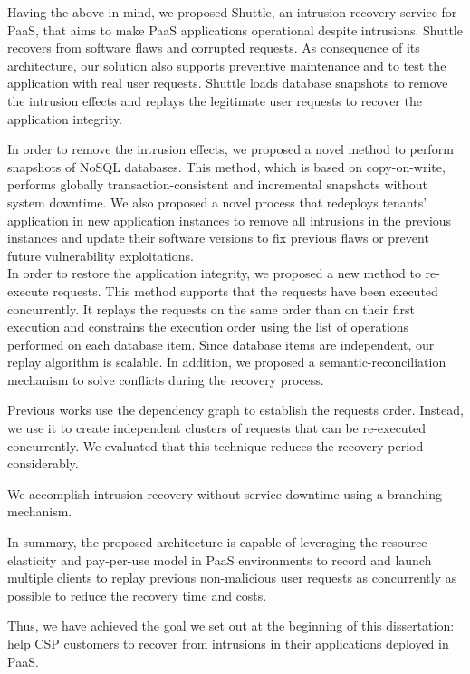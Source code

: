 Having the above in mind, we proposed Shuttle, an intrusion recovery service for \ac{PaaS}, that aims to make \ac{PaaS} applications operational despite intrusions. Shuttle recovers from software flaws and corrupted requests. As consequence of its architecture, our solution also supports preventive maintenance and to test the application with real user requests. Shuttle loads database snapshots to remove the intrusion effects and replays the legitimate user requests to recover the application integrity.

In order to remove the intrusion effects, we proposed a novel method to perform snapshots of \acs{NoSQL} databases. This method, which is based on copy-on-write, performs globally transaction-consistent and incremental snapshots without system downtime. We also proposed a novel process that redeploys tenants' application in new application instances to remove all intrusions in the previous instances and update their software versions to fix previous flaws or prevent future vulnerability exploitations.\\

In order to restore the application integrity, we proposed a new method to re-execute requests. This method supports that the requests have been executed concurrently. It replays the requests on the same order than on their first execution and constrains the execution order using the list of operations performed on each database item. Since database items are independent, our replay algorithm is scalable. In addition, we proposed a semantic-reconciliation mechanism to solve conflicts during the recovery process.

Previous works use the dependency graph to establish the requests order. Instead, we use it to create independent clusters of requests that can be re-executed concurrently. We evaluated that this technique reduces the recovery period considerably.

We accomplish intrusion recovery without service downtime using a branching mechanism.

In summary, the proposed architecture is capable of leveraging the resource elasticity and pay-per-use model in \ac{PaaS} environments to record and launch multiple clients to replay previous non-malicious user requests as concurrently as possible to reduce the recovery time and costs.

Thus, we have achieved the goal we set out at the beginning of this dissertation: help \ac{CSP} customers to recover from intrusions in their applications deployed in \ac{PaaS}.

